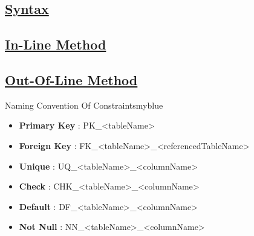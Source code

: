 \vspace{0.5cm}
\subsection*{\underline{Syntax}}

\vspace{0.25cm}

\subsection*{\underline{In-Line Method}}

\vspace{0.25cm}

\newpage

\subsection*{\underline{Out-Of-Line Method}}

\vspace{0.25cm}


\vspace{0.5cm}

\vspace{1cm}
\begin{prettyBox}{Naming Convention Of Constraints}{myblue}
  \begin{itemize}
        \item  \textbf{Primary Key} : PK\_\textless tableName\textgreater  
        \item  \textbf{Foreign Key} : FK\_\textless tableName\textgreater\_\textless referencedTableName\textgreater
        \item  \textbf{Unique} : UQ\_\textless tableName\textgreater\_\textless columnName\textgreater
        \item  \textbf{Check} : CHK\_\textless tableName\textgreater\_\textless columnName\textgreater
        \item  \textbf{Default} : DF\_\textless tableName\textgreater\_\textless columnName\textgreater
        \item  \textbf{Not Null} : NN\_\textless tableName\textgreater\_\textless columnName\textgreater
    \end{itemize}   
\end{prettyBox}

